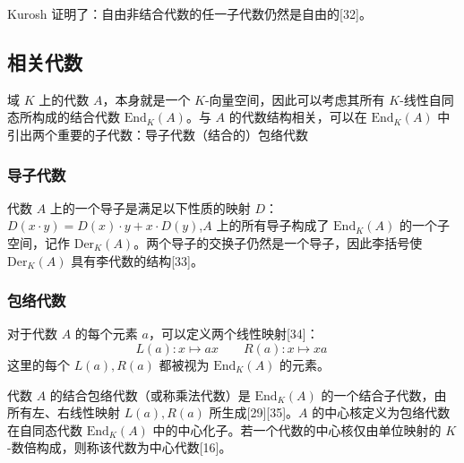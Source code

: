 Kurosh 证明了：自由非结合代数的任一子代数仍然是自由的[32]。
\subsection{相关代数}
域 $K$ 上的代数 $A$，本身就是一个 $K$-向量空间，因此可以考虑其所有 $K$-线性自同态所构成的结合代数 $\mathrm{End}_K(A)$。与 $A$ 的代数结构相关，可以在 $\mathrm{End}_K(A)$ 中引出两个重要的子代数：导子代数（结合的）包络代数
\subsubsection{导子代数}
代数 $A$ 上的一个导子是满足以下性质的映射 $D$：$D(x \cdot y) = D(x) \cdot y + x \cdot D(y)$,$A$ 上的所有导子构成了 $\mathrm{End}_K(A)$ 的一个子空间，记作 $\mathrm{Der}_K(A)$。两个导子的交换子仍然是一个导子，因此李括号使 $\mathrm{Der}_K(A)$ 具有李代数的结构[33]。
\subsubsection{包络代数}
对于代数 $A$ 的每个元素 $a$，可以定义两个线性映射[34]：
$$
L(a): x \mapsto ax \qquad R(a): x \mapsto xa~
$$
这里的每个 $L(a), R(a)$ 都被视为 $\mathrm{End}_K(A)$ 的元素。

代数 $A$ 的结合包络代数（或称乘法代数）是 $\mathrm{End}_K(A)$ 的一个结合子代数，由所有左、右线性映射 $L(a), R(a)$ 所生成[29][35]。$A$ 的中心核定义为包络代数在自同态代数 $\mathrm{End}_K(A)$ 中的中心化子。若一个代数的中心核仅由单位映射的 $K$-数倍构成，则称该代数为中心代数[16]。
